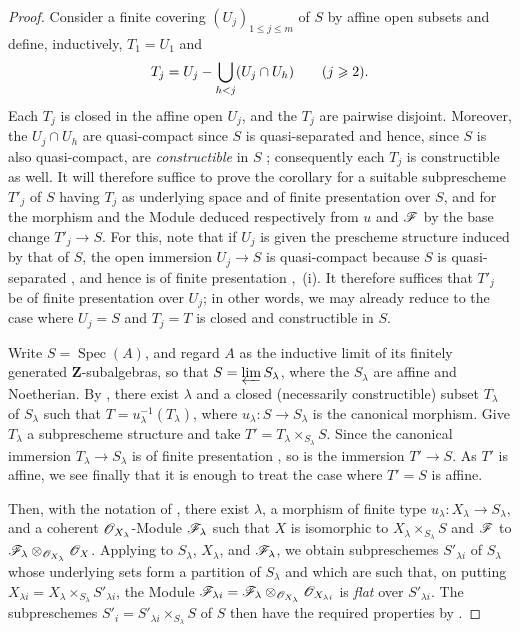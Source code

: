 \begin{proof}
Consider a finite covering $(U_j)_{1\leqslant j\leqslant m}$ of $S$ by affine open subsets and define, inductively, $T_1=U_1$ and
\[
T_j=U_j-\bigcup_{h<j}(U_j\cap U_h)\qquad(j\geqslant 2).
\]
Each $T_j$ is closed in the affine open $U_j$, and the $T_j$ are pairwise disjoint.
Moreover, the $U_j\cap U_h$ are quasi-compact since $S$ is quasi-separated and hence, since $S$ is also quasi-compact, are \emph{constructible} in $S$ ; consequently each $T_j$ is constructible as well.
It will therefore suffice to prove the corollary for a suitable subprescheme $T'_j$ of $S$ having $T_j$ as underlying space and of finite presentation over $S$, and for the morphism and the Module deduced respectively from $u$ and $\mathscr{F}$ by the base change $T'_j\to S$.
For this, note that if $U_j$ is given the prescheme structure induced by that of $S$, the open immersion $U_j\to S$ is quasi-compact because $S$ is quasi-separated , and hence is of
finite presentation ,~(i).
It therefore suffices that $T'_j$ be of finite presentation over $U_j$; in other words, we may already reduce to the case where $U_j=S$ and $T_j=T$ is closed and constructible in $S$.

Write $S=\operatorname{Spec}(A)$, and regard $A$ as the inductive limit of its finitely generated $\mathbf{Z}$-subalgebras, so that $S=\varprojlim S_\lambda$, where the $S_\lambda$ are affine and Noetherian.
By , there exist $\lambda$ and a closed (necessarily constructible) subset $T_\lambda$ of $S_\lambda$ such that $T=u_\lambda^{-1}(T_\lambda)$, where $u_\lambda:S\to S_\lambda$ is the canonical morphism.
Give $T_\lambda$ a subprescheme structure and take $T'=T_\lambda\times_{S_\lambda}S$.
Since the canonical immersion $T_\lambda\to S_\lambda$ is of finite presentation , so is the immersion $T'\to S$.
As $T'$ is affine, we see finally that it is enough to treat the case where $T'=S$ is affine.

Then, with the notation of , there exist $\lambda$, a morphism of finite type $u_\lambda:X_\lambda\to S_\lambda$, and a coherent $\mathscr{O}_{X_\lambda}$-Module $\mathscr{F}_\lambda$ such that $X$ is isomorphic to $X_\lambda\times_{S_\lambda}S$ and $\mathscr{F}$ to $\mathscr{F}_\lambda\otimes_{\mathscr{O}_{X_\lambda}}\mathscr{O}_X$.
Applying  to $S_\lambda$, $X_\lambda$, and $\mathscr{F}_\lambda$, we obtain subpreschemes $S'_{\lambda i}$ of $S_\lambda$ whose underlying sets form a partition of $S_\lambda$ and which are such that, on putting $X_{\lambda i}=X_\lambda\times_{S_\lambda}S'_{\lambda i}$, the Module $\mathscr{F}_{\lambda i}=\mathscr{F}_\lambda\otimes_{\mathscr{O}_{X_\lambda}}\mathscr{O}_{X_{\lambda i}}$
is \emph{flat} over $S'_{\lambda i}$.
The subpreschemes $S'_i=S'_{\lambda i}\times_{S_\lambda}S$ of $S$ then have the required properties by .
\end{proof}

